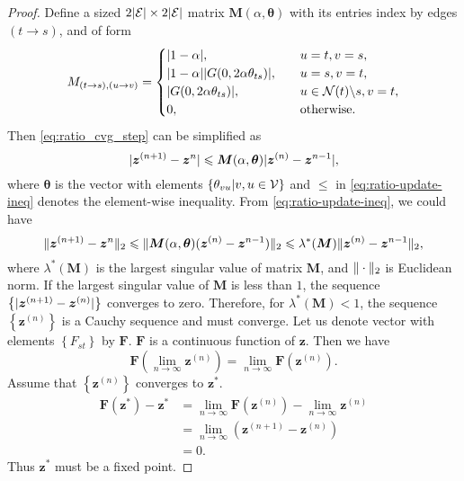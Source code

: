 \documentclass[conference,onecolumn]{IEEEtran}
\begin{document}
\begin{proof}
  Define a sized $2| \mathcal{E} | \times 2| \mathcal{E} |$ matrix $\bm{M}(\alpha, \bm{\theta})$ with its entries index by edges $(t\rightarrow s)$, and of form
  \begin{equation}
    M_{(t\rightarrow s), (u \rightarrow v)} =
    \begin{cases}
      |  1 - \alpha |, &\quad u=t, v=s, \\
      |  1 - \alpha | | G(0, 2 \alpha \theta_{ts}) |, & \quad u = s, v =t, \\
      | G(0, 2 \alpha \theta_{ts}) |, & \quad u \in \mathcal{N}(t)\backslash s, v = t, \\
      0, & \quad \mathrm{otherwise}.
    \end{cases}
  \end{equation}
  Then \eqref{eq:ratio_cvg_step} can be simplified as
  \begin{equation}\label{eq:ratio-update-ineq}
    | \bm{z}^{(n+1)} - \bm{z}^{n} | \leqslant \bm{M}(\alpha, \bm{\theta})| \bm{z}^{(n)} - \bm{z}^{n-1} |,
  \end{equation}
  where $\bm{\theta}$ is the vector with elements $\left\{ \theta_{vu}| v, u \in \mathcal{V} \right\}$ and $\leq$ in \eqref{eq:ratio-update-ineq} denotes the element-wise inequality. From \eqref{eq:ratio-update-ineq}, we could have
  \begin{equation}
    \| \bm{z}^{(n+1)} - \bm{z}^{n} \|_{2} \leqslant \| \bm{M}(\alpha, \bm{\theta})(\bm{z}^{(n)} - \bm{z}^{n-1}) \|_{2} \leqslant \lambda^{\ast}(\bm{M})\| \bm{z}^{(n)} - \bm{z}^{n-1} \|_{2},
  \end{equation}
  where $\lambda^{\ast}(\bm{M})$ is the largest singular value of matrix
  $\bm{M}$, and $\| \cdot \|_{2}$ is Euclidean norm. If the largest singular value of $\bm{M}$ is less than $1$, the sequence
  $\left\{| \bm{z}^{(n+1)} - \bm{z}^{(n)} |\right\}$ converges to zero. Therefore, for $\lambda^{\ast}(\bm{M})<1$, the sequence $\left\{ \bm{z}^{(n)} \right\}$ is a Cauchy sequence and must converge. Let us denote vector with elements $\left\{ F_{st} \right\}$ by $\bm{F}$. $\bm{F}$ is a continuous function of $\bm{z}$. Then we have
  \begin{equation}
    \bm{F}(\lim_{n\rightarrow \infty}\bm{z}^{(n)}) = \lim_{n\rightarrow \infty}\bm{F}(\bm{z}^{(n)}).
  \end{equation}
  Assume that $\left\{ \bm{z}^{(n)} \right\}$ converges to
  $\bm{z}^{\ast}$.
  \begin{align}
    \bm{F}(\bm{z}^{\ast}) - \bm{z}^{\ast}
    &= \lim_{n\rightarrow \infty} \bm{F}(\bm{z}^{(n)}) -\lim_{n\rightarrow
      \infty} \bm{z}^{(n)} \nonumber \\
    &= \lim_{n\rightarrow \infty} (\bm{z}^{(n+1)} - \bm{z}^{(n)}) \nonumber \\
    &= 0.
  \end{align}
  Thus $\bm{z}^{\ast}$ must be a fixed point.


\end{proof}
\end{document}
